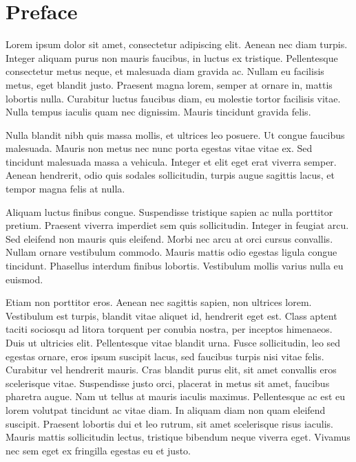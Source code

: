 \chapter*{Preface}

Lorem ipsum dolor sit amet, consectetur adipiscing elit. Aenean nec diam turpis. Integer aliquam purus non mauris faucibus, in luctus ex tristique. Pellentesque consectetur metus neque, et malesuada diam gravida ac. Nullam eu facilisis metus, eget blandit justo. Praesent magna lorem, semper at ornare in, mattis lobortis nulla. Curabitur luctus faucibus diam, eu molestie tortor facilisis vitae. Nulla tempus iaculis quam nec dignissim. Mauris tincidunt gravida felis.

Nulla blandit nibh quis massa mollis, et ultrices leo posuere. Ut congue faucibus malesuada. Mauris non metus nec nunc porta egestas vitae vitae ex. Sed tincidunt malesuada massa a vehicula. Integer et elit eget erat viverra semper. Aenean hendrerit, odio quis sodales sollicitudin, turpis augue sagittis lacus, et tempor magna felis at nulla.

Aliquam luctus finibus congue. Suspendisse tristique sapien ac nulla porttitor pretium. Praesent viverra imperdiet sem quis sollicitudin. Integer in feugiat arcu. Sed eleifend non mauris quis eleifend. Morbi nec arcu at orci cursus convallis. Nullam ornare vestibulum commodo. Mauris mattis odio egestas ligula congue tincidunt. Phasellus interdum finibus lobortis. Vestibulum mollis varius nulla eu euismod.

Etiam non porttitor eros. Aenean nec sagittis sapien, non ultrices lorem. Vestibulum est turpis, blandit vitae aliquet id, hendrerit eget est. Class aptent taciti sociosqu ad litora torquent per conubia nostra, per inceptos himenaeos. Duis ut ultricies elit. Pellentesque vitae blandit urna. Fusce sollicitudin, leo sed egestas ornare, eros ipsum suscipit lacus, sed faucibus turpis nisi vitae felis. Curabitur vel hendrerit mauris. Cras blandit purus elit, sit amet convallis eros scelerisque vitae. Suspendisse justo orci, placerat in metus sit amet, faucibus pharetra augue. Nam ut tellus at mauris iaculis maximus. Pellentesque ac est eu lorem volutpat tincidunt ac vitae diam. In aliquam diam non quam eleifend suscipit. Praesent lobortis dui et leo rutrum, sit amet scelerisque risus iaculis. Mauris mattis sollicitudin lectus, tristique bibendum neque viverra eget. Vivamus nec sem eget ex fringilla egestas eu et justo.